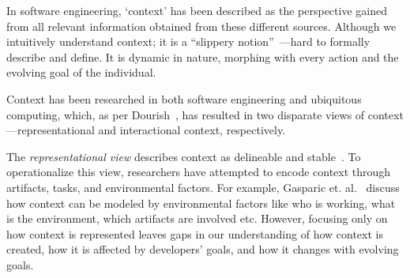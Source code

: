 
In software engineering, `context' has been described as the perspective gained from all relevant information obtained from these different sources. Although we intuitively understand context; it is a ``slippery notion''~\cite{Dourish:2004}---hard to formally describe and define. It is dynamic in nature, morphing with every action and the evolving goal of the individual. 

Context has been researched in both software engineering and ubiquitous computing, which, as per Dourish~\cite{Dourish:2004}, has resulted in two disparate views of context---representational and interactional context, respectively.

The \textit{representational view} describes context as delineable and stable~\cite{Schilit:1994a,Abowd:1999,Pascoe:1998}. To operationalize this view, researchers have attempted to encode context through artifacts, tasks, and environmental factors. For example, Gasparic et. al.~\cite{Gasparic:2017} discuss how context can be modeled by environmental factors like who is working, what is the environment, which artifacts are involved etc.
However, focusing only on how context is represented leaves gaps in our understanding of how context is created, how it is affected by developers' goals, and how it changes with evolving goals. 

